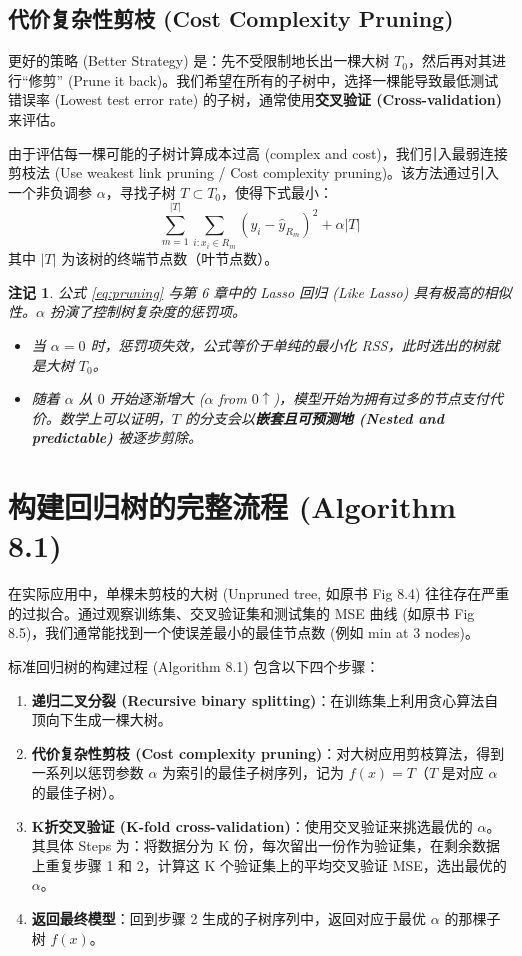 \documentclass[UTF8]{ctexart}
\newtheorem{remark}{注记}[section]
\numberwithin{equation}{section}
\begin{document}
\subsection{代价复杂性剪枝 (Cost Complexity Pruning)}
更好的策略 (Better Strategy) 是：先不受限制地长出一棵大树 $T_0$，然后再对其进行“修剪” (Prune it back)。我们希望在所有的子树中，选择一棵能导致最低测试错误率 (Lowest test error rate) 的子树，通常使用\textbf{交叉验证 (Cross-validation)} 来评估。

由于评估每一棵可能的子树计算成本过高 (complex and cost)，我们引入最弱连接剪枝法 (Use weakest link pruning / Cost complexity pruning)。该方法通过引入一个非负调参 $\alpha$，寻找子树 $T \subset T_0$，使得下式最小：
\begin{equation}
\sum_{m=1}^{|T|} \sum_{i: x_i \in R_m} (y_i - \hat{y}_{R_m})^2 + \alpha |T|
\label{eq:pruning}
\end{equation}
其中 $|T|$ 为该树的终端节点数（叶节点数）。

\begin{remark}
公式 \eqref{eq:pruning} 与第 6 章中的 Lasso 回归 (Like Lasso) 具有极高的相似性。$\alpha$ 扮演了控制树复杂度的惩罚项。
\begin{itemize}
    \item 当 $\alpha = 0$ 时，惩罚项失效，公式等价于单纯的最小化 RSS，此时选出的树就是大树 $T_0$。
    \item 随着 $\alpha$ 从 $0$ 开始逐渐增大 ($\alpha$ from $0 \uparrow$)，模型开始为拥有过多的节点支付代价。数学上可以证明，$T$ 的分支会以\textbf{嵌套且可预测地 (Nested and predictable)} 被逐步剪除。
\end{itemize}
\end{remark}




\section{构建回归树的完整流程 (Algorithm 8.1)}
在实际应用中，单棵未剪枝的大树 (Unpruned tree, 如原书 Fig 8.4) 往往存在严重的过拟合。通过观察训练集、交叉验证集和测试集的 MSE 曲线 (如原书 Fig 8.5)，我们通常能找到一个使误差最小的最佳节点数 (例如 min at 3 nodes)。

标准回归树的构建过程 (Algorithm 8.1) 包含以下四个步骤：
\begin{enumerate}
    \item \textbf{递归二叉分裂 (Recursive binary splitting)}：在训练集上利用贪心算法自顶向下生成一棵大树。
    \item \textbf{代价复杂性剪枝 (Cost complexity pruning)}：对大树应用剪枝算法，得到一系列以惩罚参数 $\alpha$ 为索引的最佳子树序列，记为 $f(x) = T$（$T$ 是对应 $\alpha$ 的最佳子树）。
    \item \textbf{K折交叉验证 (K-fold cross-validation)}：使用交叉验证来挑选最优的 $\alpha$。其具体 Steps 为：将数据分为 K 份，每次留出一份作为验证集，在剩余数据上重复步骤 1 和 2，计算这 K 个验证集上的平均交叉验证 MSE，选出最优的 $\alpha$。
    \item \textbf{返回最终模型}：回到步骤 2 生成的子树序列中，返回对应于最优 $\alpha$ 的那棵子树 $f(x)$。
\end{enumerate}
\end{document}
